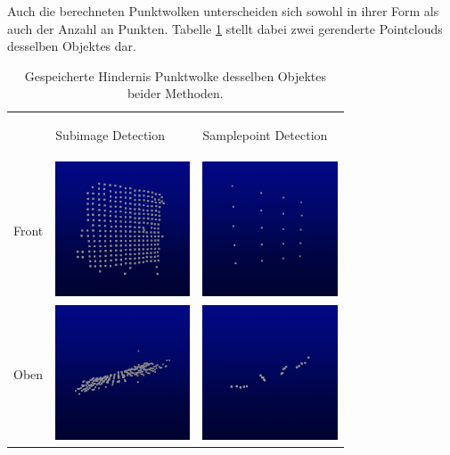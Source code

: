 \noindent
Auch die berechneten Punktwolken unterscheiden sich sowohl in ihrer Form als auch der Anzahl an Punkten. Tabelle \ref{fig:obstacle_pointclouds} stellt dabei zwei gerenderte Pointclouds desselben Objektes dar.

\begin{table}[h]
\centering
\begin{tabular}{m{2cm} m{4cm} m{4cm}}
    & \begin{center} {\scriptsize Subimage Detection} \end{center}
    & \begin{center} {\scriptsize Samplepoint Detection} \end{center}\\
	{ \scriptsize Front}
	& \includegraphics[width=4cm]{img/pointclouds/pcl_sample_front}
	& \includegraphics[width=4cm]{img/pointclouds/pcl_sub_front}\\
	{ \scriptsize Oben}
	& \includegraphics[width=4cm]{img/pointclouds/pcl_sample_top}
	& \includegraphics[width=4cm]{img/pointclouds/pcl_sub_top}
\end{tabular}
\caption{Gespeicherte Hindernis Punktwolke desselben Objektes beider Methoden.}
\label{fig:obstacle_pointclouds}
\end{table}


